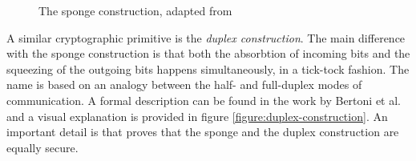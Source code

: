 \begin{figure}
  \caption{The sponge construction, adapted from \cite{bertoni:2011:duplexing,marcos:2015:lyra2}}
  \label{figure:sponge-construction}
\end{figure}

A similar cryptographic primitive is the \emph{duplex construction}. The main difference with the sponge construction is that both the absorbtion of incoming bits and the squeezing of the outgoing bits happens simultaneously, in a tick-tock fashion. The name is based on an analogy between the half- and full-duplex modes of communication. A formal description can be found in the work by Bertoni et al. \cite{bertoni:2011:duplexing} and a visual explanation is provided in figure \ref{figure:duplex-construction}. An important detail is that \cite{bertoni:2011:duplexing} proves that the sponge and the duplex construction are equally secure.

